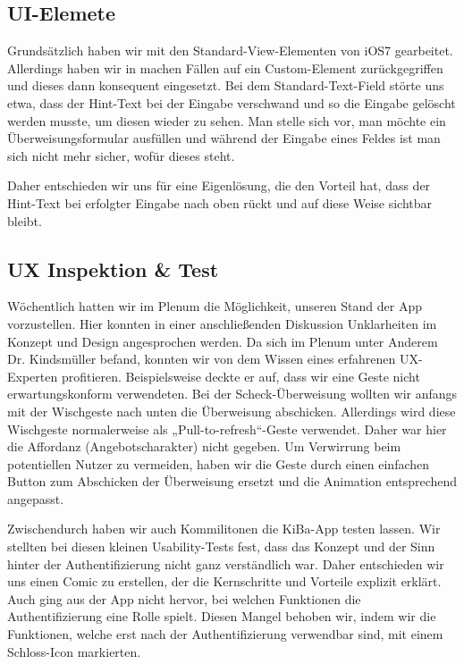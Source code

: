 \subsection{UI-Elemete}
	Grundsätzlich haben wir mit den Standard-View-Elementen von iOS7 gearbeitet. Allerdings haben wir in machen Fällen auf ein Custom-Element zurückgegriffen und dieses dann konsequent eingesetzt. Bei dem Standard-Text-Field störte uns etwa, dass der Hint-Text bei der Eingabe verschwand und so die Eingabe gelöscht werden musste, um diesen wieder zu sehen. Man stelle sich vor, man möchte ein Überweisungsformular ausfüllen und während der Eingabe eines Feldes ist man sich nicht mehr sicher, wofür dieses steht. 

	Daher entschieden wir uns für eine Eigenlösung, die den Vorteil hat, dass der Hint-Text bei erfolgter Eingabe nach oben rückt und auf diese Weise sichtbar bleibt. 

\subsection{UX Inspektion \& Test}
	Wöchentlich hatten wir im Plenum die Möglichkeit, unseren Stand der App vorzustellen. Hier konnten in einer anschließenden Diskussion Unklarheiten im Konzept und Design angesprochen werden. Da sich im Plenum unter Anderem Dr. Kindsmüller befand, konnten wir von dem Wissen eines erfahrenen UX-Experten profitieren. Beispielsweise deckte er auf, dass wir eine Geste nicht erwartungskonform verwendeten. Bei der Scheck-Überweisung wollten wir anfangs mit der Wischgeste nach unten die Überweisung abschicken. Allerdings wird diese Wischgeste normalerweise als „Pull-to-refresh“-Geste verwendet. Daher war hier die Affordanz (Angebotscharakter) nicht gegeben. Um Verwirrung beim potentiellen Nutzer zu vermeiden, haben wir die Geste durch einen einfachen Button zum Abschicken der Überweisung ersetzt und die Animation entsprechend angepasst.

	Zwischendurch haben wir auch Kommilitonen die KiBa-App testen lassen. Wir stellten bei diesen kleinen Usability-Tests fest, dass das Konzept und der Sinn hinter der Authentifizierung nicht ganz verständlich war. Daher entschieden wir uns einen Comic zu erstellen, der die Kernschritte und Vorteile explizit erklärt. Auch ging aus der App nicht hervor, bei welchen Funktionen die Authentifizierung eine Rolle spielt. Diesen Mangel behoben wir, indem wir die Funktionen, welche erst nach der Authentifizierung verwendbar sind, mit einem Schloss-Icon markierten.
	
